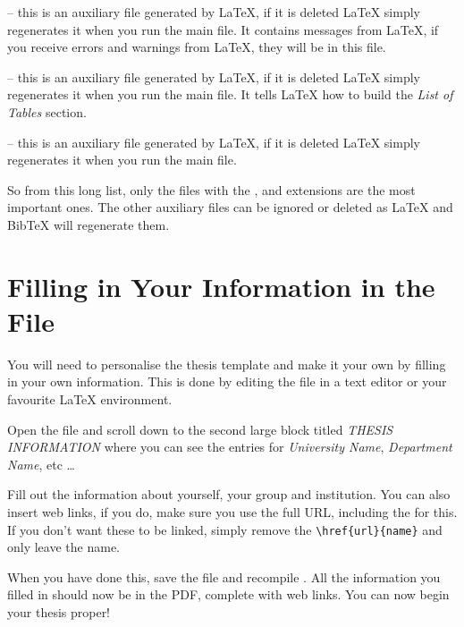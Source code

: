 -- this is an auxiliary file generated by \LaTeX{}, if it is deleted \LaTeX{} simply regenerates it when you run the main  file. It contains messages from \LaTeX{}, if you receive errors and warnings from \LaTeX{}, they will be in this  file.

 -- this is an auxiliary file generated by \LaTeX{}, if it is deleted \LaTeX{} simply regenerates it when you run the main  file. It tells \LaTeX{} how to build the \emph{List of Tables} section.

 -- this is an auxiliary file generated by \LaTeX{}, if it is deleted \LaTeX{} simply regenerates it when you run the main  file.

So from this long list, only the files with the ,  and  extensions are the most important ones. The other auxiliary files can be ignored or deleted as \LaTeX{} and BibTeX will regenerate them.


\section{Filling in Your Information in the  File}\label{FillingFile}

You will need to personalise the thesis template and make it your own by filling in your own information. This is done by editing the  file in a text editor or your favourite LaTeX environment.

Open the file and scroll down to the second large block titled \emph{THESIS INFORMATION} where you can see the entries for \emph{University Name}, \emph{Department Name}, etc \ldots

Fill out the information about yourself, your group and institution. You can also insert web links, if you do, make sure you use the full URL, including the  for this. If you don't want these to be linked, simply remove the \verb|\href{url}{name}| and only leave the name.

When you have done this, save the file and recompile . All the information you filled in should now be in the PDF, complete with web links. You can now begin your thesis proper!


